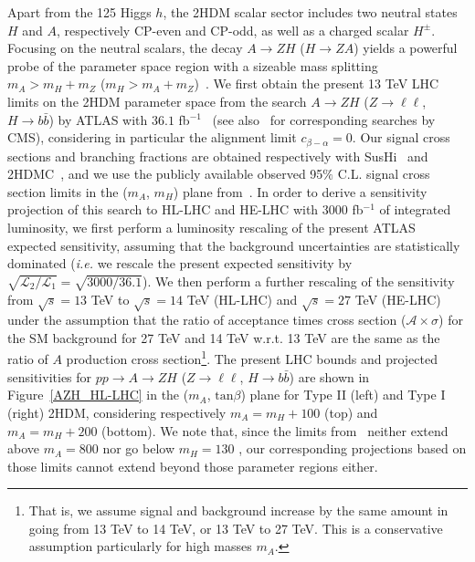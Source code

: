 Apart from the 125 \UGeV Higgs $h$, the 2HDM scalar sector includes two neutral states 
$H$ and $A$, respectively CP-even and CP-odd, as well as a charged scalar $H^{\pm}$.
Focusing on the neutral scalars, the decay $A \to Z H$ ($H \to Z A$) yields a powerful probe of the parameter space region with a sizeable mass splitting $m_A > m_H + m_Z$ ($m_H > m_A + m_Z$)~\cite{Coleppa:2014hxa,Dorsch:2014qja}. We first obtain the present 13 TeV LHC limits on the 2HDM parameter space from the search $A \to Z H$ ($Z\to \ell\ell$, $H \to b\bar{b}$) by ATLAS with $36.1$ fb$^{-1}$~\cite{Aaboud:2018eoy} (see also~\cite{Khachatryan:2016are,CMS:2016qxc} for 
corresponding searches by CMS), considering in particular the alignment limit $c_{\beta -\alpha} = 0$.
Our signal cross sections and branching fractions are obtained respectively with {\sc SusHi}~\cite{Harlander:2012pb} and {\sc 2HDMC}~\cite{Eriksson:2009ws}, and we use the 
publicly available observed 95$\%$ C.L. signal cross section limits in the ($m_A$, $m_H$) plane from~\cite{Aaboud:2018eoy}. In order to derive a sensitivity projection of this search to HL-LHC and HE-LHC with $3000$ fb$^{-1}$ of integrated luminosity, we first perform a luminosity rescaling of the present ATLAS expected sensitivity, assuming that the background uncertainties are statistically dominated ({\it i.e.} we rescale the present expected sensitivity by $\sqrt{\mathcal{L}_2/\mathcal{L}_1} = \sqrt{3000/36.1}$).
We then perform a further rescaling of the sensitivity from $\sqrt{s} = 13$ TeV to 
$\sqrt{s} = 14$ TeV (HL-LHC) and $\sqrt{s} = 27$ TeV (HE-LHC) under the assumption that the
ratio of acceptance times cross section ($\mathcal{A} \times \sigma$) for the SM background for 27 TeV and 14 TeV w.r.t. 13 TeV are the same as the ratio of $A$ production cross section\footnote{That is, we assume signal and background increase by the same amount in going from 13 TeV to 14 TeV, or 13 TeV to 27 TeV. This is a conservative assumption particularly for high masses $m_A$.}. 
The present LHC bounds and projected sensitivities for $p p \to A \to Z H$ ($Z\to \ell\ell$, $H \to b\bar{b}$) are shown in Figure~\ref{AZH_HL-LHC} in the ($m_A$, $\mathrm{tan}\beta$) plane for Type II (left) and Type I (right) 2HDM, considering respectively $m_A = m_H + 100$ \UGeV (top) and $m_A = m_H + 200$ \UGeV (bottom).
We note that, since the limits from~\cite{Aaboud:2018eoy} neither extend above 
$m_A = 800$ \UGeV nor go below $m_H = 130$ \UGeV, our corresponding projections based on those limits cannot 
extend beyond those parameter regions either.  

